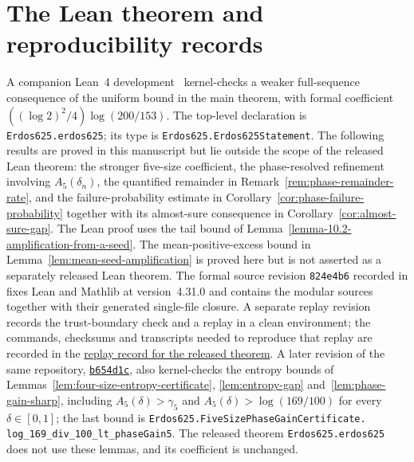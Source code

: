 \documentclass[a4paper,10pt,reqno]{amsart}
\numberwithin{equation}{section}
\theoremstyle{plain}
\theoremstyle{remark}
\begin{document}
\section{The Lean theorem and reproducibility records}\label{app:lean-reproducibility}
A companion Lean~4 development~\citep{petkov-erdos625-lean} kernel-checks a
weaker full-sequence consequence of the uniform bound in the main
theorem, with formal coefficient
$((\log 2)^2/4)\log(200/153)$. The top-level declaration is
\texttt{Erdos625.\allowbreak erdos625}; its type is
\texttt{Erdos625.\allowbreak Erdos625Statement}. The following results are
proved in this manuscript but lie outside the scope of the released Lean
theorem: the stronger five-size coefficient, the phase-resolved refinement
involving $A_5(\delta_n)$, the quantified remainder in
Remark~\ref{rem:phase-remainder-rate}, and the failure-probability estimate in
Corollary~\ref{cor:phase-failure-probability} together with its almost-sure
consequence in Corollary~\ref{cor:almost-sure-gap}.
The Lean proof uses the tail bound of
Lemma~\ref{lemma-10.2-amplification-from-a-seed}. The mean-positive-excess
bound in Lemma~\ref{lem:mean-seed-amplification} is proved here but is not
asserted as a separately released Lean theorem.
The formal source revision \texttt{824e4b6} recorded in
\citet{petkov-erdos625-lean} fixes Lean and Mathlib at version~4.31.0 and
contains the modular sources together with their generated single-file
closure. A separate replay revision records the trust-boundary check and a
replay in a clean environment; the commands, checksums and transcripts needed
to reproduce that replay are recorded in the \href{https://github.com/SamPetkov/Erdos/blob/31bbe00c529a996bdb61b880120d71240172d18f/625/formalization/replay/aristotle-03e8124e-c359-4219-8b37-442060dae209/README.md}{replay record for the released theorem}.
A later revision of the same repository,
\href{https://github.com/SamPetkov/Erdos/tree/b654d1ca6eaddaf3025fe4d487628ec4d05a21b9/625/formalization}{\texttt{b654d1c}},
also kernel-checks the entropy bounds of
Lemmas~\ref{lem:four-size-entropy-certificate}, \ref{lem:entropy-gap}
and~\ref{lem:phase-gain-sharp}, including $A_5(\delta)>\gamma_5$ and
$A_5(\delta)>\log(169/100)$ for every $\delta\in[0,1]$; the last bound is
\texttt{Erdos625.\allowbreak FiveSizePhaseGainCertificate.\allowbreak
log\_169\_div\_100\_lt\_phaseGain5}. The released
theorem \texttt{Erdos625.\allowbreak erdos625} does not use these lemmas, and
its coefficient is unchanged.
\end{document}
